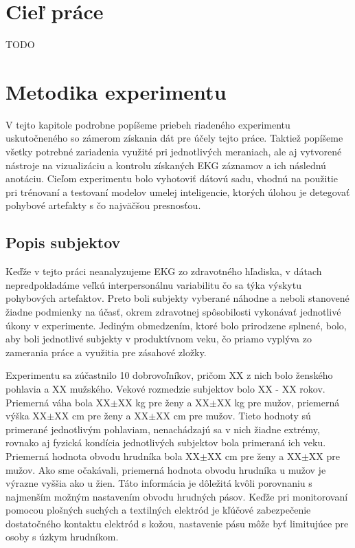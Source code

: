 \chapter{Cieľ práce}

TODO



\chapter{Metodika experimentu}

V tejto kapitole podrobne popíšeme priebeh riadeného experimentu uskutočneného so zámerom získania dát pre účely tejto práce. Taktiež popíšeme všetky potrebné zariadenia využité pri jednotlivých meraniach, ale aj vytvorené nástroje na vizualizáciu a kontrolu získaných EKG záznamov a ich následnú anotáciu. Cieľom experimentu bolo vyhotoviť dátovú sadu, vhodnú na použitie pri trénovaní a testovaní modelov umelej inteligencie, ktorých úlohou je detegovať pohybové artefakty s čo najväčšou presnosťou.


\section{Popis subjektov}

Keďže v tejto práci neanalyzujeme EKG zo zdravotného hľadiska, v dátach nepredpokladáme veľkú interpersonálnu variabilitu čo sa týka výskytu pohybových artefaktov. Preto boli subjekty vyberané náhodne a neboli stanovené žiadne podmienky na účasť, okrem zdravotnej spôsobilosti vykonávať jednotlivé úkony v experimente. Jediným obmedzením, ktoré bolo prirodzene splnené, bolo, aby boli jednotlivé subjekty v produktívnom veku, čo priamo vyplýva zo zamerania práce a využitia pre zásahové zložky. 

Experimentu sa zúčastnilo 10 dobrovoľníkov, pričom XX z nich bolo ženského pohlavia a XX mužského. Vekové rozmedzie subjektov bolo XX - XX rokov. Priemerná váha bola XX\( \pm \)XX kg pre ženy a XX\( \pm \)XX kg pre mužov, priemerná výška XX\( \pm \)XX cm pre ženy a XX\( \pm \)XX cm pre mužov. Tieto hodnoty sú primerané jednotlivým pohlaviam, nenachádzajú sa v nich žiadne extrémy, rovnako aj fyzická kondícia jednotlivých subjektov bola primeraná ich veku. Priemerná hodnota obvodu hrudníka bola XX\( \pm \)XX cm pre ženy a XX\( \pm \)XX pre mužov. Ako sme očakávali, priemerná hodnota obvodu hrudníka u mužov je výrazne vyššia ako u žien. Táto informácia je dôležitá kvôli porovnaniu s najmenším možným nastavením obvodu hrudných pásov. Keďže pri monitorovaní pomocou plošných suchých a textilných elektród je kľúčové zabezpečenie dostatočného kontaktu elektród s kožou, nastavenie pásu môže byť limitujúce pre osoby s úzkym hrudníkom.

